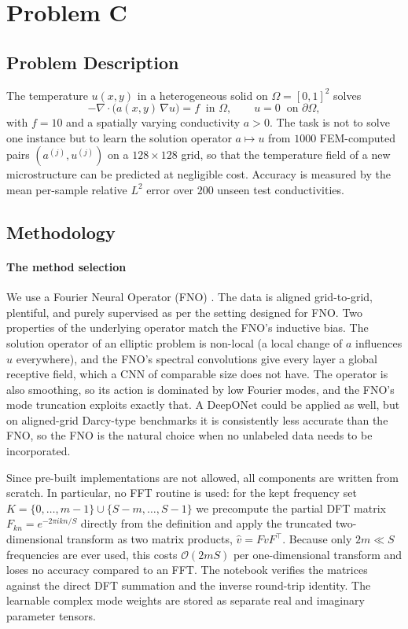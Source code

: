 \chapter{Problem C}
\label{ch:problem_C}
%
\section{Problem Description}
The temperature $u(x,y)$ in a heterogeneous solid on $\Omega = [0,1]^2$
solves
\begin{equation}
    -\nabla\cdot\big(a(x,y)\,\nabla u\big) = f \;\;\text{in } \Omega,
    \qquad u = 0 \;\;\text{on } \partial\Omega,
\end{equation}
with $f = 10$ and a spatially varying conductivity $a > 0$. The task is not
to solve one instance but to learn the solution operator $a \mapsto u$ from
$1000$ FEM-computed pairs $(a^{(j)}, u^{(j)})$ on a $128\times128$ grid, so
that the temperature field of a new microstructure can be predicted at
negligible cost. Accuracy is measured by the mean per-sample relative $L^2$
error over $200$ unseen test conductivities.
%
\section{Methodology}
%
\subsubsection{The method selection}
We use a Fourier Neural Operator (FNO) \cite{li2021fno}. The data is
aligned grid-to-grid, plentiful, and purely supervised as per the setting designed for FNO. Two properties of the underlying operator match the
FNO's inductive bias. The solution operator of an elliptic problem is
non-local (a local change of $a$ influences $u$ everywhere), and the FNO's
spectral convolutions give every layer a global receptive field, which a
CNN of comparable size does not have. The operator is also smoothing, so
its action is dominated by low Fourier modes, and the FNO's mode truncation
exploits exactly that. A DeepONet \cite{lu2021deeponet} could be applied
as well, but on aligned-grid Darcy-type benchmarks it is consistently less
accurate than the FNO, so the FNO is the natural choice when no unlabeled
data needs to be incorporated.

Since pre-built implementations are not allowed, all components are written
from scratch. In particular, no FFT routine is used: for the kept frequency
set $K = \{0,\dots,m-1\}\cup\{S-m,\dots,S-1\}$ we precompute the partial
DFT matrix $F_{kn} = e^{-2\pi i k n / S}$ directly from the definition and
apply the truncated two-dimensional transform as two matrix products,
$\widehat{v} = F v F^{\top}$. Because only $2m \ll S$ frequencies are ever
used, this costs $\mathcal{O}(2mS)$ per one-dimensional transform and loses
no accuracy compared to an FFT. The notebook verifies the matrices against
the direct DFT summation and the inverse round-trip identity. The learnable
complex mode weights are stored as separate real and imaginary parameter
tensors.
%
